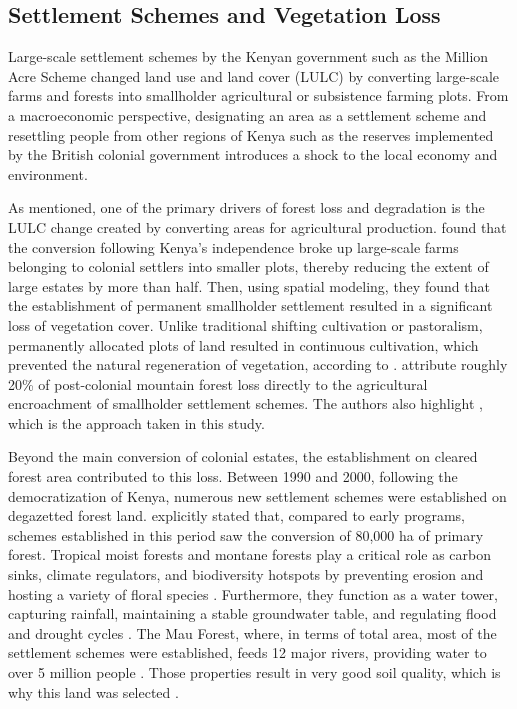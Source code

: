 \subsection{Settlement Schemes and Vegetation Loss}

Large-scale settlement schemes by the Kenyan government such as the Million Acre Scheme changed land use and land cover (LULC) by converting large-scale farms and forests into smallholder agricultural or subsistence farming plots.
From a macroeconomic perspective, designating an area as a settlement scheme and resettling people from other regions of Kenya \parencite{leoLandClassKenya1984}
such as the reserves implemented by the British colonial government introduces a shock to the local economy and environment.

As mentioned, one of the primary drivers of forest loss and degradation is the LULC change created by converting areas for agricultural production.
\cite{gitauColonialeraSettlementsPostcolonial2025} found that the conversion following Kenya's independence broke up large-scale farms belonging to colonial settlers into smaller plots, thereby reducing the extent of large estates by more than half.
Then, using spatial modeling, they found that the establishment of permanent smallholder settlement resulted in a significant loss of vegetation cover.
Unlike traditional shifting cultivation or pastoralism, permanently allocated plots of land resulted in continuous cultivation, which prevented the natural regeneration of vegetation, according to \cite{serneelsProximateCausesLanduse2001}.
\cite{gitauColonialeraSettlementsPostcolonial2025} attribute roughly 20\% of post-colonial mountain forest loss directly to the agricultural encroachment of smallholder settlement schemes.
The authors also highlight  \parencite{gitauColonialeraSettlementsPostcolonial2025}, which is the approach taken in this study.

Beyond the main conversion of colonial estates, the establishment on cleared forest area contributed to this loss.
Between 1990 and 2000, following the democratization of Kenya, numerous new settlement schemes were established on degazetted forest land.
\cite{gitauColonialeraSettlementsPostcolonial2025} explicitly stated that, compared to early programs, schemes established in this period saw the conversion of 80,000 ha of primary forest.
Tropical moist forests and montane forests play a critical role as carbon sinks, climate regulators, and biodiversity hotspots by preventing erosion and hosting a variety of floral species \parencite{boeleeEcosystemsWaterFood2011}.
Furthermore, they function as a water tower, capturing rainfall, maintaining a stable groundwater table, and regulating flood and drought cycles \parencite{boeleeEcosystemsWaterFood2011}.
The Mau Forest, where, in terms of total area, most of the settlement schemes were established, feeds 12 major rivers, providing water to over 5 million people \parencite{jacobsLandUseAffects2017}.
Those properties result in very good soil quality, which is why this land was selected \parencite{sanfordDemocratizationElectionsPublic2023}.

